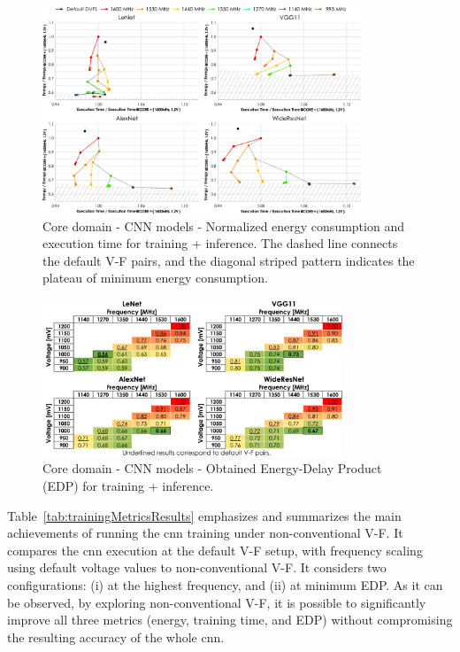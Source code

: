 \begin{figure}[!htb]
    \centering
        \includegraphics[width=0.85\textwidth]{Figures/Application To Deep Learning/CNN_behaviour.pdf}
        \caption{Core domain - CNN models - Normalized energy consumption and execution time for training + inference. The dashed line connects the default V-F pairs, and the diagonal striped pattern indicates the plateau of minimum energy consumption.}
    \label{fig:CNN_Behaviour_training_inf}
\end{figure}

\begin{figure}[!htb]
    \centering
        \includegraphics[width=0.8\textwidth]{Figures/Application To Deep Learning/CNN_EDP.pdf}
        \caption{Core domain - CNN models - Obtained Energy-Delay Product (EDP) for training + inference.}
    \label{fig:CNN_EDP_training_inf}
\end{figure}

Table~\ref{tab:trainingMetricsResults} emphasizes and summarizes the main achievements of running the \acrshort{cnn} training under non-conventional V-F. It compares the \acrshort{cnn} execution at the default V-F setup, with frequency scaling using default voltage values to non-conventional V-F. It considers two configurations: (i) at the highest frequency, and (ii) at minimum EDP. As it can be observed, by exploring non-conventional V-F, it is possible to significantly improve all three metrics (energy, training time, and EDP) without compromising the resulting accuracy of the whole \acrshort{cnn}. 


